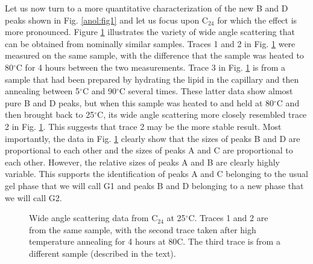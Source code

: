 Let us now turn to a more quantitative characterization of the new
B and D peaks shown in Fig. \ref{anol:fig1} and let us focus upon C$_{24}$ 
for which the 
effect is more pronounced.  Figure \ref{anol:fig3} illustrates the variety of 
wide angle scattering that can be obtained from nominally similar samples.
Traces 1 and 2 in Fig. \ref{anol:fig3} were measured on the same sample,
with the difference that the sample was heated to 80$^{\circ}$C for
4 hours between the two measurements. Trace 3 in Fig. \ref{anol:fig3} is from a sample that 
had been prepared by hydrating the lipid in the capillary and then annealing 
between 5$^{\circ}$C and 90$^{\circ}$C several times. These latter data show 
almost pure B and D peaks, but when this sample was heated to and held at 
80$^{\circ}$C and then brought back to 25$^{\circ}$C, its wide angle 
scattering more closely resembled trace 2 in Fig. \ref{anol:fig3}.  This 
suggests that 
trace 2 may be the more stable result.  Most importantly, the data in 
Fig. \ref{anol:fig3} 
clearly show that the sizes of peaks B and D are proportional to each other 
and the sizes of peaks A and C are proportional to each other. However, the 
relative sizes of peaks A and B are clearly highly variable.
This supports the identification of peaks A and C belonging to the usual gel 
phase that we will call G1 and peaks B and D belonging to a new phase that 
we will call G2.

\begin{figure}[t]
\centerline {}
\caption{Wide angle scattering data from C$_{24}$ at 25$^{\circ}$C.
Traces 1 and 2 are from the same sample, with the second trace taken after high
temperature annealing for 4 hours at 80C. The third trace is from a
different sample (described in the text).
\label{anol:fig3}}
\end{figure}


